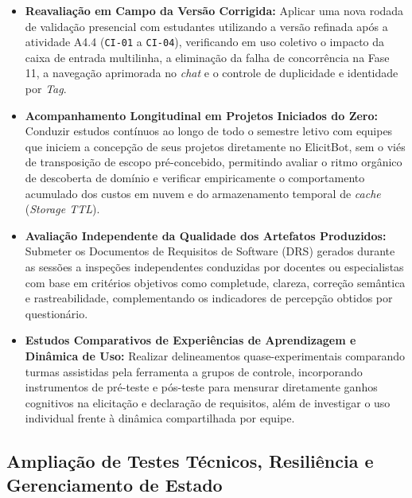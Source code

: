 \begin{itemize}
    \item \textbf{Reavaliação em Campo da Versão Corrigida:} Aplicar uma nova rodada de validação presencial com estudantes utilizando a versão refinada após a atividade A4.4 (\texttt{CI-01} a \texttt{CI-04}), verificando em uso coletivo o impacto da caixa de entrada multilinha, a eliminação da falha de concorrência na Fase 11, a navegação aprimorada no \textit{chat} e o controle de duplicidade e identidade por \textit{Tag}.
    \item \textbf{Acompanhamento Longitudinal em Projetos Iniciados do Zero:} Conduzir estudos contínuos ao longo de todo o semestre letivo com equipes que iniciem a concepção de seus projetos diretamente no ElicitBot, sem o viés de transposição de escopo pré-concebido, permitindo avaliar o ritmo orgânico de descoberta de domínio e verificar empiricamente o comportamento acumulado dos custos em nuvem e do armazenamento temporal de \textit{cache} (\textit{Storage TTL}).
    \item \textbf{Avaliação Independente da Qualidade dos Artefatos Produzidos:} Submeter os Documentos de Requisitos de Software (DRS) gerados durante as sessões a inspeções independentes conduzidas por docentes ou especialistas com base em critérios objetivos como completude, clareza, correção semântica e rastreabilidade, complementando os indicadores de percepção obtidos por questionário.
    \item \textbf{Estudos Comparativos de Experiências de Aprendizagem e Dinâmica de Uso:} Realizar delineamentos quase-experimentais comparando turmas assistidas pela ferramenta a grupos de controle, incorporando instrumentos de pré-teste e pós-teste para mensurar diretamente ganhos cognitivos na elicitação e declaração de requisitos, além de investigar o uso individual frente à dinâmica compartilhada por equipe.
\end{itemize}

\subsection*{Ampliação de Testes Técnicos, Resiliência e Gerenciamento de Estado}

